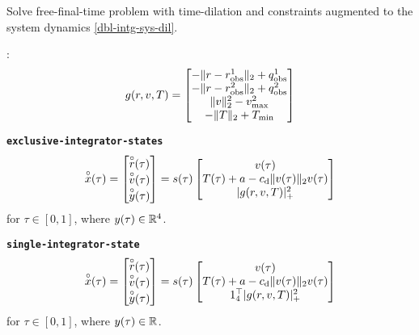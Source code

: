 \documentclass[11pt,a4paper]{article}
\begin{document}
Solve free-final-time problem with time-dilation and constraints augmented to the system dynamics \eqref{dbl-intg-sys-dil}.

:
\begin{align*}
    g(r,v,T) = \begin{bmatrix}
                  -\|r - r^1_{\mathrm{obs}}\|_2 + q^1_{\mathrm{obs}} \\
                  -\|r - r^2_{\mathrm{obs}}\|_2 + q^2_{\mathrm{obs}} \\
                   \|v\|_2^2 - v_{\max}^2 \\
                  -\|T\|_2 + T_{\min}
               \end{bmatrix}
\end{align*}


\textbf{\texttt{exclusive-integrator-states}}
\begin{align}
    \overset{\circ}{x}(\tau) = \begin{bmatrix}
                        \overset{\circ}{r}(\tau) \\
                        \overset{\circ}{v}(\tau) \\
                        \overset{\circ}{y}(\tau) 
                     \end{bmatrix} = s(\tau)\begin{bmatrix}
                                        v(\tau) \\
                                        T(\tau) + a - c_{\mathrm{d}}\|v(\tau)\|_2v(\tau) \\
                                        |g(r,v,T)|_+^2
                                     \end{bmatrix}\label{dbl-intg-dilaugsys-exclu}
\end{align}
for $\tau\in[0,1]$, where $y(\tau)\in\mathbb{R}^{4}$.

\textbf{\texttt{single-integrator-state}}
\begin{align}
    \overset{\circ}{x}(\tau) = \begin{bmatrix}
                        \overset{\circ}{r}(\tau) \\
                        \overset{\circ}{v}(\tau) \\
                        \overset{\circ}{y}(\tau) 
                     \end{bmatrix} = s(\tau)\begin{bmatrix}
                                        v(\tau) \\
                                        T(\tau) + a - c_{\mathrm{d}}\|v(\tau)\|_2v(\tau) \\
                                        1_4^\top|g(r,v,T)|_+^2
                                     \end{bmatrix}\label{dbl-intg-dilaugsys-single}
\end{align}
for $\tau\in[0,1]$, where $y(\tau)\in\mathbb{R}^{}$.
\end{document}
